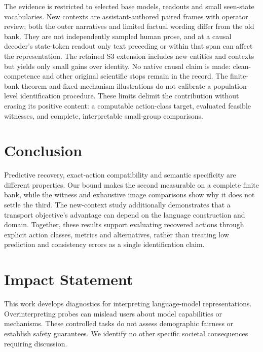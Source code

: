 \documentclass[10pt]{article}
\begin{document}
The evidence is restricted to selected base models, readouts and small seen-state vocabularies. New contexts are assistant-authored paired frames with operator review; both the outer narratives and limited factual wording differ from the old bank. They are not independently sampled human prose, and at a causal decoder's state-token readout only text preceding or within that span can affect the representation. The retained S3 extension includes new entities and contexts but yields only small gains over identity. No native causal claim is made: clean-competence and other original scientific stops remain in the record. The finite-bank theorem and fixed-mechanism illustrations do not calibrate a population-level identification procedure. These limits delimit the contribution without erasing its positive content: a computable action-class target, evaluated feasible witnesses, and complete, interpretable small-group comparisons.

\section{Conclusion}
Predictive recovery, exact-action compatibility and semantic specificity are different properties. Our bound makes the second measurable on a complete finite bank, while the witness and exhaustive image comparisons show why it does not settle the third. The new-context study additionally demonstrates that a transport objective's advantage can depend on the language construction and domain. Together, these results support evaluating recovered actions through explicit action classes, metrics and alternatives, rather than treating low prediction and consistency errors as a single identification claim.

\FloatBarrier
\label{sec:main-end}

\section*{Impact Statement}
This work develops diagnostics for interpreting language-model representations. Overinterpreting probes can mislead users about model capabilities or mechanisms. These controlled tasks do not assess demographic fairness or establish safety guarantees. We identify no other specific societal consequences requiring discussion.



\appendix









\end{document}
